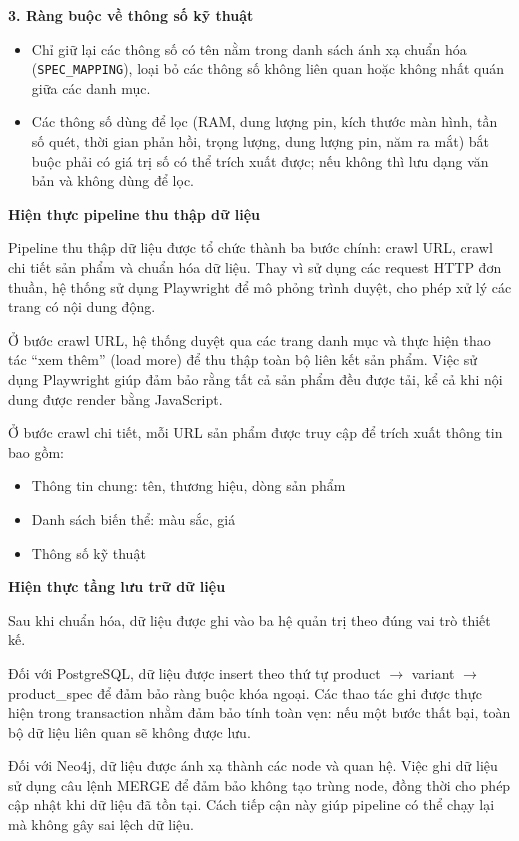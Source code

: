 \textbf{3. Ràng buộc về thông số kỹ thuật}

\begin{itemize}
    \item Chỉ giữ lại các thông số có tên nằm trong danh sách ánh xạ chuẩn hóa (\texttt{SPEC\_MAPPING}), loại bỏ các thông số không liên quan hoặc không nhất quán giữa các danh mục.
    \item Các thông số dùng để lọc (RAM, dung lượng pin, kích thước màn hình, tần số quét, thời gian phản hồi, trọng lượng, dung lượng pin, năm ra mắt) bắt buộc phải có giá trị số có thể trích xuất được; nếu không thì lưu dạng văn bản và không dùng để lọc.
\end{itemize}

\textbf{Hiện thực pipeline thu thập dữ liệu}

Pipeline thu thập dữ liệu được tổ chức thành ba bước chính: crawl URL, crawl chi tiết sản phẩm và chuẩn hóa dữ liệu. Thay vì sử dụng các request HTTP đơn thuần, hệ thống sử dụng Playwright để mô phỏng trình duyệt, cho phép xử lý các trang có nội dung động.

Ở bước crawl URL, hệ thống duyệt qua các trang danh mục và thực hiện thao tác ``xem thêm'' (load more) để thu thập toàn bộ liên kết sản phẩm. Việc sử dụng Playwright giúp đảm bảo rằng tất cả sản phẩm đều được tải, kể cả khi nội dung được render bằng JavaScript.

Ở bước crawl chi tiết, mỗi URL sản phẩm được truy cập để trích xuất thông tin bao gồm:

\begin{itemize}
\item Thông tin chung: tên, thương hiệu, dòng sản phẩm
\item Danh sách biến thể: màu sắc, giá
\item Thông số kỹ thuật
\end{itemize}

\textbf{Hiện thực tầng lưu trữ dữ liệu}

Sau khi chuẩn hóa, dữ liệu được ghi vào ba hệ quản trị theo đúng vai trò thiết kế.

Đối với PostgreSQL, dữ liệu được insert theo thứ tự product $\rightarrow$ variant $\rightarrow$ product\_spec để đảm bảo ràng buộc khóa ngoại. Các thao tác ghi được thực hiện trong transaction nhằm đảm bảo tính toàn vẹn: nếu một bước thất bại, toàn bộ dữ liệu liên quan sẽ không được lưu.

Đối với Neo4j, dữ liệu được ánh xạ thành các node và quan hệ. Việc ghi dữ liệu sử dụng câu lệnh MERGE để đảm bảo không tạo trùng node, đồng thời cho phép cập nhật khi dữ liệu đã tồn tại. Cách tiếp cận này giúp pipeline có thể chạy lại mà không gây sai lệch dữ liệu.

